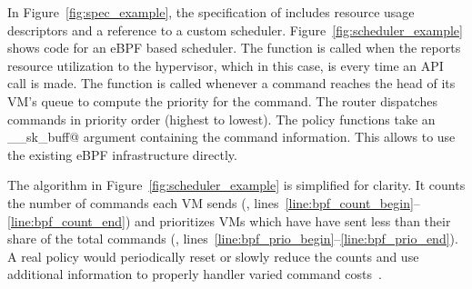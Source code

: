 {In Figure~\ref{fig:spec_example}, the specification of %
\spec@cuLaunchKernel@ includes resource usage descriptors and a reference to a custom scheduler.
Figure~\ref{fig:scheduler_example} shows code for an eBPF based scheduler.
The \spec@consume@ function is called when the \worker reports resource utilization to the hypervisor, which
in this case, is every time an API call is made.
The \spec@schedule@ function is called whenever a command reaches the head of its VM's queue to compute the priority for the command.
The router dispatches commands in priority order (highest to lowest).
The \model policy functions take an \spec@__sk_buff@ argument containing the \model command information.
This allows \model to use the existing eBPF infrastructure directly.

The algorithm in Figure~\ref{fig:scheduler_example} is simplified for clarity.
It counts the number of commands each VM sends (\spec@consume@, lines~\ref{line:bpf_count_begin}--\ref{line:bpf_count_end}) and prioritizes VMs which have have sent less than their share of the total commands (\spec@schedule@, lines~\ref{line:bpf_prio_begin}--\ref{line:bpf_prio_end}).
A real policy would periodically reset or slowly reduce the counts and use additional information to properly handler varied command costs~\cite{sched_survey,rossbach2011ptask,aimd}.



\endgroup

